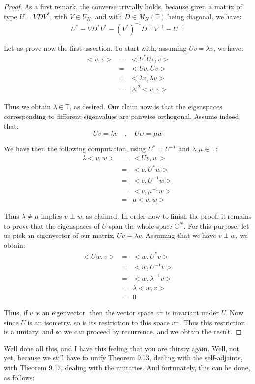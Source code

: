 \documentclass[12pt]{amsbook}
\begin{document}
\begin{proof}
As a first remark, the converse trivially holds, because given a matrix of type $U=VDV^*$, with $V\in U_N$, and with $D\in M_N(\mathbb T)$ being diagonal, we have:
$$U^*
=VD^*V^*
=(V^*)^{-1}D^{-1}V^{-1}
=U^{-1}$$

Let us prove now the first assertion. To start with, assuming $Uv=\lambda v$, we have:
\begin{eqnarray*}
<v,v>
&=&<U^*Uv,v>\\
&=&<Uv,Uv>\\
&=&<\lambda v,\lambda v>\\
&=&|\lambda|^2<v,v>
\end{eqnarray*}

Thus we obtain $\lambda\in\mathbb T$, as desired. Our claim now is that the eigenspaces corresponding to different eigenvalues are pairwise orthogonal. Assume indeed that:
$$Uv=\lambda v\quad,\quad 
Uw=\mu w$$

We have then the following computation, using $U^*=U^{-1}$ and $\lambda,\mu\in\mathbb T$:
\begin{eqnarray*}
\lambda<v,w>
&=&<Uv,w>\\
&=&<v,U^*w>\\
&=&<v,U^{-1}w>\\
&=&<v,\mu^{-1}w>\\
&=&\mu<v,w>
\end{eqnarray*}

Thus $\lambda\neq\mu$ implies $v\perp w$, as claimed. In order now to finish the proof, it remains to prove that the eigenspaces of $U$ span the whole space $\mathbb C^N$. For this purpose, let us pick an eigenvector of our matrix, $Uv=\lambda v$. Assuming that we have $v\perp w$, we obtain:
\begin{eqnarray*}
<Uw,v>
&=&<w,U^*v>\\
&=&<w,U^{-1}v>\\
&=&<w,\lambda^{-1}v>\\
&=&\lambda<w,v>\\
&=&0
\end{eqnarray*}

Thus, if $v$ is an eigenvector, then the vector space $v^\perp$ is invariant under $U$. Now since $U$ is an isometry, so is its restriction to this space $v^\perp$. Thus this restriction is a unitary, and so we can proceed by recurrence, and we obtain the result.
\end{proof}

Well done all this, and I have this feeling that you are thirsty again. Well, not yet, because we still have to unify Theorem 9.13, dealing with the self-adjoints, with Theorem 9.17, dealing with the unitaries. And fortunately, this can be done, as follows:
\end{document}
